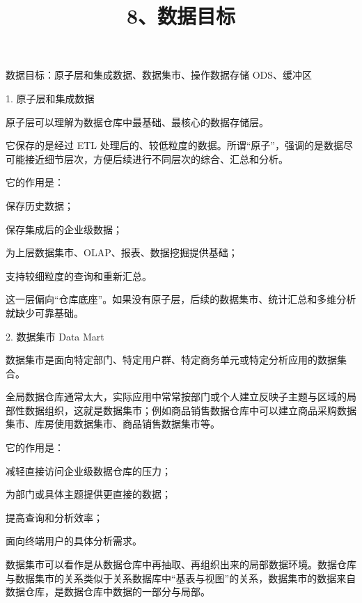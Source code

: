 \documentclass[UTF8,zihao=-4]{ctexart}
\begin{document}
\title{8、数据目标}
\author{}
\date{}
\maketitle

数据目标：原子层和集成数据、数据集市、操作数据存储 ODS、缓冲区\par

1. 原子层和集成数据\par

原子层可以理解为数据仓库中最基础、最核心的数据存储层。\par

它保存的是经过 ETL 处理后的、较低粒度的数据。所谓“原子”，强调的是数据尽可能接近细节层次，方便后续进行不同层次的综合、汇总和分析。\par

它的作用是：\par

保存历史数据；\par
保存集成后的企业级数据；\par
为上层数据集市、OLAP、报表、数据挖掘提供基础；\par
支持较细粒度的查询和重新汇总。\par

这一层偏向“仓库底座”。如果没有原子层，后续的数据集市、统计汇总和多维分析就缺少可靠基础。\par

2. 数据集市 Data Mart\par

数据集市是面向特定部门、特定用户群、特定商务单元或特定分析应用的数据集合。\par

全局数据仓库通常太大，实际应用中常常按部门或个人建立反映子主题与区域的局部性数据组织，这就是数据集市；例如商品销售数据仓库中可以建立商品采购数据集市、库房使用数据集市、商品销售数据集市等。\par

它的作用是：\par

减轻直接访问企业级数据仓库的压力；\par
为部门或具体主题提供更直接的数据；\par
提高查询和分析效率；\par
面向终端用户的具体分析需求。\par

数据集市可以看作是从数据仓库中再抽取、再组织出来的局部数据环境。数据仓库与数据集市的关系类似于关系数据库中“基表与视图”的关系，数据集市的数据来自数据仓库，是数据仓库中数据的一部分与局部。\par
\end{document}
